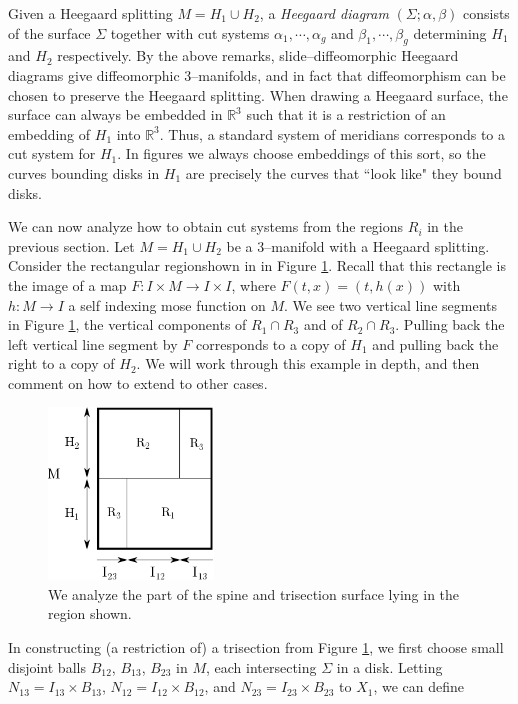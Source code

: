 \documentclass[12pt]{amsart}
\newcommand{\R}{\mathbb{R}}
\theoremstyle{definition}
\theoremstyle{remark}
\begin{document}
Given a Heegaard splitting $M = H_1 \cup H_2$, a \emph{Heegaard diagram} $(\Sigma; \alpha, \beta)$ consists of the surface $\Sigma$ together with cut systems $\alpha_1,\cdots,\alpha_g$ and $\beta_1,\cdots,\beta_g$ determining $H_1$ and $H_2$ respectively.  By the above remarks, slide--diffeomorphic Heegaard diagrams give diffeomorphic 3--manifolds, and in fact that diffeomorphism can be chosen to preserve the Heegaard splitting.  When drawing a Heegaard surface, the surface can always be embedded in $\R^3$ such that it is a restriction of an embedding of $H_1$ into $\R^3$.  Thus, a standard system of meridians corresponds to a cut system for $H_1$.  In figures we always choose embeddings of this sort, so the curves bounding disks in $H_1$ are precisely the curves that ``look like" they bound disks.

We can now analyze how to obtain cut systems from the regions $R_i$ in the previous section.  Let $M = H_1 \cup H_2$ be a 3--manifold with a Heegaard splitting.  Consider the rectangular regionshown in in Figure \ref{sectionbreakdown}.  Recall that this rectangle is the image of a map $F\colon I \times M \to I \times I$, where $F(t,x) = (t,h(x))$ with $h\colon M \to I$ a self indexing mose function on $M$.  We see two vertical line segments in Figure \ref{sectionbreakdown}, the vertical components of $R_1 \cap R_3$ and of $R_2 \cap R_3$.  Pulling back the left vertical line segment by $F$ corresponds to a copy of $H_1$ and pulling back the right to a copy of $H_2$.  We will work through this example in depth, and then comment on how to extend to other cases.  

\begin{figure}[h]
\centering
\includegraphics[height=1.8in]{MxS1_section.png}
\caption{We analyze the part of the spine and trisection surface lying in the region shown.}
\label{sectionbreakdown}
\end{figure}

In constructing (a restriction of) a trisection from Figure \ref{sectionbreakdown}, we first choose small disjoint balls $B_{12}$, $B_{13}$, $B_{23}$ in $M$, each intersecting $\Sigma$ in a disk.  Letting $N_{13} = I_{13} \times B_{13}$, $N_{12} = I_{12} \times B_{12}$, and $N_{23} = I_{23} \times B_{23}$ to $X_1$, we can define
\end{document}
